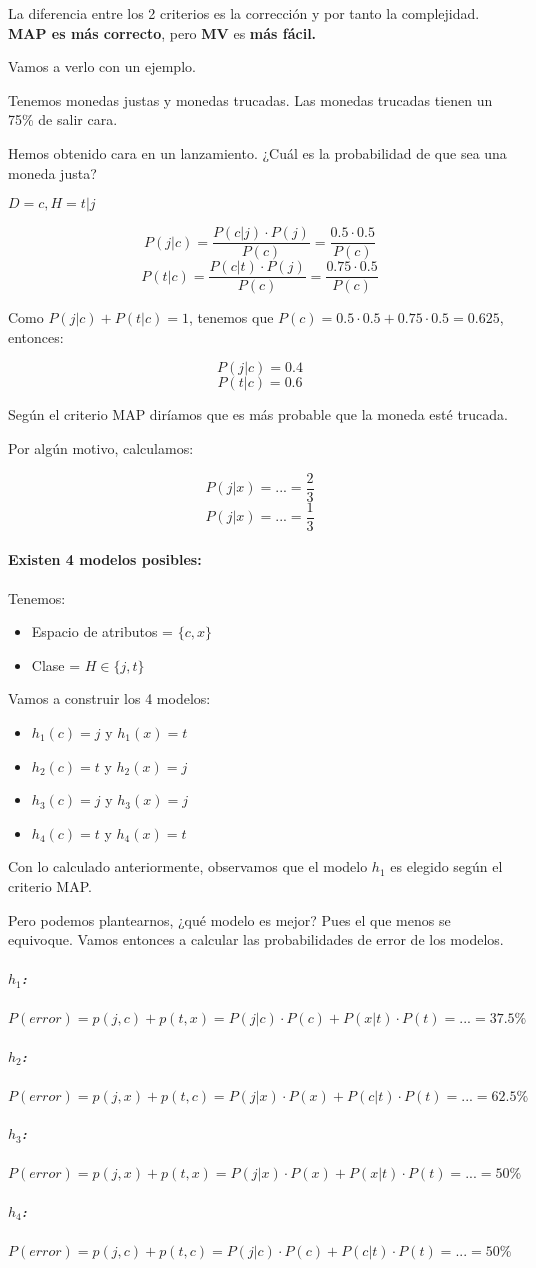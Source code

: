 \documentclass{apuntes}
\begin{document}
La diferencia entre los 2 criterios es la corrección y por tanto la complejidad. \textbf{MAP es más correcto}, pero \textbf{MV} es \textbf{más fácil.} 

Vamos a verlo con un ejemplo.

\begin{example}
Tenemos monedas justas y monedas trucadas. Las monedas trucadas tienen un 75\% de salir cara.

Hemos obtenido cara en un lanzamiento. ¿Cuál es la probabilidad de que sea una moneda justa?

$D=c, H=t|j$

\[
P(j|c) = \frac{P(c|j)·P(j)}{P(c)} = \frac{0.5·0.5}{P(c)}
\]
\[
P(t|c) = \frac{P(c|t)·P(j)}{P(c)} = \frac{0.75·0.5}{P(c)}
\]

Como $P(j|c) + P(t|c) = 1$, tenemos que $P(c) = 0.5·0.5 + 0.75·0.5 = 0.625$, entonces:

\[P(j|c) = 0.4\]
\[P(t|c) = 0.6\]

Según el criterio MAP diríamos que es más probable que la moneda esté trucada. 

Por algún motivo, calculamos:

\[P(j|x) = ... = \frac{2}{3}\]
\[P(j|x) = ... = \frac{1}{3}\]



\paragraph{Existen 4 modelos posibles:}
Tenemos:
\begin{itemize}
\item Espacio de atributos = $\{c,x\}$ 
\item Clase = $H\in\{j,t\}$
\end{itemize}

Vamos a construir los 4 modelos:

\begin{itemize}
	\item $h_1(c) = j$ y $h_1(x) = t$ 
	\item $h_2(c) = t$ y $h_2(x) = j$ 
	\item $h_3(c) = j$ y $h_3(x) = j$ 
	\item $h_4(c) = t$ y $h_4(x) = t$ 
\end{itemize}

Con lo calculado anteriormente, observamos que el modelo $h_1$ es elegido según el criterio MAP.

Pero podemos plantearnos, ¿qué modelo es mejor? Pues el que menos se equivoque. Vamos entonces a calcular las probabilidades de error de los modelos.

\subparagraph{$h_1$:} $P(error) = p(j,c) + p(t,x) = P(j|c)·P(c) + P(x|t)·P(t) = ... = 37.5\%$
\subparagraph{$h_2$:} $P(error) = p(j,x) + p(t,c) = P(j|x)·P(x) + P(c|t)·P(t) = ... = 62.5\%$
\subparagraph{$h_3$:} $P(error) = p(j,x) + p(t,x) = P(j|x)·P(x) + P(x|t)·P(t) = ... = 50\%$
\subparagraph{$h_4$:} $P(error) = p(j,c) + p(t,c) = P(j|c)·P(c) + P(c|t)·P(t) = ... = 50\%$
\end{example}
\end{document}
